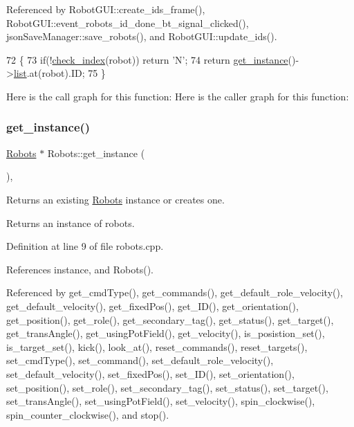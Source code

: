 Referenced by Robot\+G\+U\+I\+::create\+\_\+ids\+\_\+frame(), Robot\+G\+U\+I\+::event\+\_\+robots\+\_\+id\+\_\+done\+\_\+bt\+\_\+signal\+\_\+clicked(), json\+Save\+Manager\+::save\+\_\+robots(), and Robot\+G\+U\+I\+::update\+\_\+ids().


\begin{DoxyCode}
72                              \{
73     \textcolor{keywordflow}{if}(!\hyperlink{robots_8hpp_ae3e6ae8f87cdc750c0b99bc609d9ae43}{check\_index}(robot)) \textcolor{keywordflow}{return} \textcolor{charliteral}{'N'};
74     \textcolor{keywordflow}{return} \hyperlink{class_robots_a589bce74db5f34af384952d48435168f}{get\_instance}()->\hyperlink{class_robots_a2c6b77265028f82a4342ca1ef15ed305}{list}.at(robot).ID;
75 \}
\end{DoxyCode}
Here is the call graph for this function\+:
Here is the caller graph for this function\+:
\mbox{\label{class_robots_a589bce74db5f34af384952d48435168f}} 
\subsubsection{\texorpdfstring{get\+\_\+instance()}{get\_instance()}}
{\footnotesize\ttfamily \hyperlink{class_robots}{Robots} $\ast$ Robots\+::get\+\_\+instance (\begin{DoxyParamCaption}{ }\end{DoxyParamCaption})\hspace{0.3cm}{\ttfamily [static]}, {\ttfamily [private]}}

Returns an existing \hyperlink{class_robots}{Robots} instance or creates one. \begin{DoxyReturn}{Returns}
an instance of robots. 
\end{DoxyReturn}


Definition at line 9 of file robots.\+cpp.



References instance, and Robots().



Referenced by get\+\_\+cmd\+Type(), get\+\_\+commands(), get\+\_\+default\+\_\+role\+\_\+velocity(), get\+\_\+default\+\_\+velocity(), get\+\_\+fixed\+Pos(), get\+\_\+\+I\+D(), get\+\_\+orientation(), get\+\_\+position(), get\+\_\+role(), get\+\_\+secondary\+\_\+tag(), get\+\_\+status(), get\+\_\+target(), get\+\_\+trans\+Angle(), get\+\_\+using\+Pot\+Field(), get\+\_\+velocity(), is\+\_\+posistion\+\_\+set(), is\+\_\+target\+\_\+set(), kick(), look\+\_\+at(), reset\+\_\+commands(), reset\+\_\+targets(), set\+\_\+cmd\+Type(), set\+\_\+command(), set\+\_\+default\+\_\+role\+\_\+velocity(), set\+\_\+default\+\_\+velocity(), set\+\_\+fixed\+Pos(), set\+\_\+\+I\+D(), set\+\_\+orientation(), set\+\_\+position(), set\+\_\+role(), set\+\_\+secondary\+\_\+tag(), set\+\_\+status(), set\+\_\+target(), set\+\_\+trans\+Angle(), set\+\_\+using\+Pot\+Field(), set\+\_\+velocity(), spin\+\_\+clockwise(), spin\+\_\+counter\+\_\+clockwise(), and stop().


